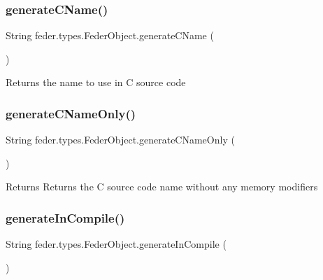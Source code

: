 \subsubsection{\texorpdfstring{generate\+C\+Name()}{generateCName()}}
{\footnotesize\ttfamily String feder.\+types.\+Feder\+Object.\+generate\+C\+Name (\begin{DoxyParamCaption}{ }\end{DoxyParamCaption})}

\begin{DoxyReturn}{Returns}
the name to use in C source code 
\end{DoxyReturn}
\mbox{\label{classfeder_1_1types_1_1FederObject_ada1a393c691be4b1cded1a59936d58af}} 
\subsubsection{\texorpdfstring{generate\+C\+Name\+Only()}{generateCNameOnly()}}
{\footnotesize\ttfamily String feder.\+types.\+Feder\+Object.\+generate\+C\+Name\+Only (\begin{DoxyParamCaption}{ }\end{DoxyParamCaption})}

\begin{DoxyReturn}{Returns}
Returns the C source code name without any memory modifiers 
\end{DoxyReturn}
\mbox{\label{classfeder_1_1types_1_1FederObject_abd2747e5a73af451a3280fecb1afa12b}} 
\subsubsection{\texorpdfstring{generate\+In\+Compile()}{generateInCompile()}}
{\footnotesize\ttfamily String feder.\+types.\+Feder\+Object.\+generate\+In\+Compile (\begin{DoxyParamCaption}{ }\end{DoxyParamCaption})}

